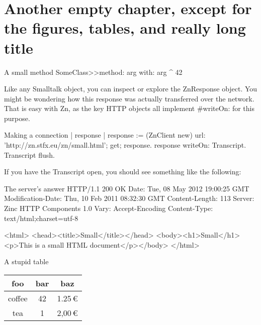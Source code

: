 \documentclass{sbabook}
\begin{document}
\chapter{Another empty chapter, except for the figures, tables, and really long title}

\begin{leftbar}
    \lipsum[2]
\end{leftbar}

\begin{script}[fortytwo]{A small method}
SomeClass>>method: arg with: arg
    ^ 42
\end{script}

Like any Smalltalk object, you can inspect or explore the ZnResponse object. You might be wondering how this response was actually transferred over the network. That is easy with Zn, as the key HTTP objects all implement \#writeOn: for this purpose.

\begin{script}{Making a connection}
| response |
response := (ZnClient new)
  url: 'http://zn.stfx.eu/zn/small.html';
  get;
  response.
response writeOn: Transcript.
Transcript flush.
\end{script}

If you have the Transcript open, you should see something like the following:

\begin{script}{The server's answer}
HTTP/1.1 200 OK
Date: Tue, 08 May 2012 19:00:25 GMT
Modification-Date: Thu, 10 Feb 2011 08:32:30 GMT
Content-Length: 113
Server: Zinc HTTP Components 1.0
Vary: Accept-Encoding
Content-Type: text/html;charset=utf-8

<html>
<head><title>Small</title></head>
<body><h1>Small</h1><p>This is a small HTML document</p></body>
</html>
\end{script}

\begin{table}[p]
    \begin{sidecaption}{A stupid table}
        \begin{tabular}{ccc}
            \toprule
            foo & bar & baz \\
            \midrule
            coffee & 42 & 1.25\,€ \\
            tea & 1 & 2,00\,€ \\
            \bottomrule
        \end{tabular}
    \end{sidecaption}
\end{table}
\end{document}
